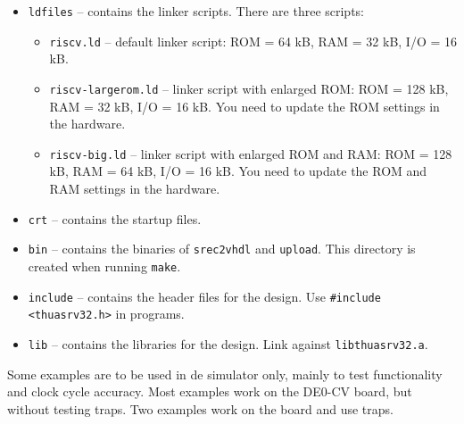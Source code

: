 \documentclass[12pt]{article}
\begin{document}
\begin{itemize}
\item \lstinline|ldfiles| -- contains the linker scripts. There are three scripts:
\begin{itemize}
\item \lstinline|riscv.ld| -- default linker script: ROM = 64 kB, RAM = 32 kB, I/O = 16 kB.
\item \lstinline|riscv-largerom.ld| -- linker script with enlarged ROM: ROM = 128 kB, RAM = 32 kB, I/O = 16 kB. You need to update the ROM settings in the hardware.
\item \lstinline|riscv-big.ld| -- linker script with enlarged ROM and RAM: ROM = 128 kB, RAM = 64 kB, I/O = 16 kB. You need to update the ROM and RAM settings in the hardware.
\end{itemize}
\item \lstinline|crt| -- contains the startup files.
\item \lstinline|bin| -- contains the binaries of \lstinline|srec2vhdl| and \lstinline|upload|. This directory is created when running \lstinline|make|.
\item \lstinline|include| -- contains the header files for the design. Use \lstinline|#include <thuasrv32.h>| in programs.
\item \lstinline|lib| -- contains the libraries for the design. Link against \lstinline|libthuasrv32.a|.
\end{itemize}

Some examples are to be used in de simulator only, mainly to test functionality and clock cycle accuracy. Most examples work on the DE0-CV board, but without testing traps. Two examples work on the board and use traps.
\end{document}
